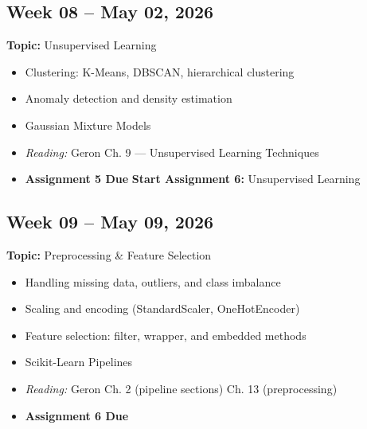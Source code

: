 \documentclass[
  10pt,
]{article}
\providecommand{\tightlist}{%
  \setlength{\itemsep}{0pt}\setlength{\parskip}{0pt}}
\newenvironment{blackbox}{%
  \def\FrameCommand{%
    \hspace{1pt}%
    {\color{boxborder}\vrule width 2pt}%
    {\color{boxbg}\vrule width 4pt}%
    \colorbox{boxbg}%
  }%
  \MakeFramed{\advance\hsize-\width\FrameRestore}%
  \noindent\ignorespaces
}{%
  \endMakeFramed
}
\begin{document}
\begin{blackbox}

\begin{center}

\subsection{Week 08 -- May 02, 2026}\label{week-08-may-02-2026}

\end{center}

\textbf{Topic:} Unsupervised Learning

\begin{itemize}
\tightlist
\item
  Clustering: K-Means, DBSCAN, hierarchical clustering
\item
  Anomaly detection and density estimation
\item
  Gaussian Mixture Models
\item
  \emph{Reading:} Geron Ch. 9 --- Unsupervised Learning Techniques
\item
  \textbf{Assignment 5 Due} \textbar{} \textbf{Start Assignment 6:}
  Unsupervised Learning
\end{itemize}

\end{blackbox}

\begin{blackbox}

\begin{center}

\subsection{Week 09 -- May 09, 2026}\label{week-09-may-09-2026}

\end{center}

\textbf{Topic:} Preprocessing \& Feature Selection

\begin{itemize}
\tightlist
\item
  Handling missing data, outliers, and class imbalance
\item
  Scaling and encoding (StandardScaler, OneHotEncoder)
\item
  Feature selection: filter, wrapper, and embedded methods
\item
  Scikit-Learn Pipelines
\item
  \emph{Reading:} Geron Ch. 2 (pipeline sections) \textbar{} Ch. 13
  (preprocessing)
\item
  \textbf{Assignment 6 Due}
\end{itemize}

\end{blackbox}
\end{document}
